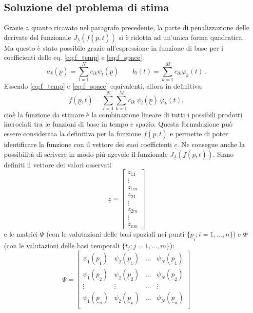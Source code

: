 \documentclass[a4paper,11pt,twoside,openright]{book}							%
\begin{document}
\subsection{Soluzione del problema di stima}
Grazie a quanto ricavato nel paragrafo precedente, la parte di penalizzazione delle derivate del funzionale $J_{\underline \lambda }(f(\underline p,t))$ si è ridotta ad un'unica forma quadratica. Ma questo è stato possibile grazie all'espressione in funzione di base per i coefficienti delle eq. \ref{eq:f_temp} e \ref{eq:f_space}:
$$
a_k(\underline p)=\sum_{l=1}^N c_{lk}\psi_l(\underline p) \qquad b_l(t)=\sum_{k=1}^M c_{lk}\varphi_k(t) \ .
$$
Essendo \ref{eq:f_temp} e \ref{eq:f_space} equivalenti, allora in definitiva:
\begin{equation} 
\label{eq:basisexp}
f(\underline p,t)=\sum_{l=1}^N \sum_{k=1}^M c_{lk}\ \psi_l(\underline p)\ \varphi_k(t) ,
\end{equation}
cioè la funzione da stimare è la combinazione lineare di tutti i possibili prodotti incrociati tra le funzioni di base in tempo e spazio. Questa formulazione può essere considerata la definitiva per la funzione $f(\underline p,t)$ e permette di poter identificare la funzione con il vettore dei suoi coefficienti $\underline{c}$. Ne consegue anche la possibilità di scrivere in modo più agevole il funzionale $J_{\underline \lambda }(f(\underline p,t))$. Siano definiti il vettore dei valori osservati
\begin{equation}
\underline z =
\begin{bmatrix}
z_{11}  \\
\vdots\\
z_{1m}  \\
z_{21}  \\
\vdots\\
z_{2m}  \\
\vdots\\
z_{nm}
\end{bmatrix}
\end{equation}
e le matrici $\Psi$ (con le valutazioni delle basi spaziali nei punti $\{\underline p_i; i = 1,\ldots,n\}$) e $\Phi$ (con le valutazioni delle basi temporali $\{t_j; j = 1,\ldots,m\}$):
$$
\Psi =
\begin{bmatrix}
\psi_{1}(\underline p_1) & \psi_{2}(\underline p_1) & \hdots & \psi_{N}(\underline p_1)  \\
\psi_{1}(\underline p_2) & \psi_{2}(\underline p_2) & \hdots & \psi_{N}(\underline p_2)  \\
\vdots & \vdots & \hdots & \vdots \\
\psi_{1}(\underline p_n) & \psi_{2}(\underline p_n) & \hdots & \psi_{N}(\underline p_n)  \\
\end{bmatrix}
$$
\end{document}
